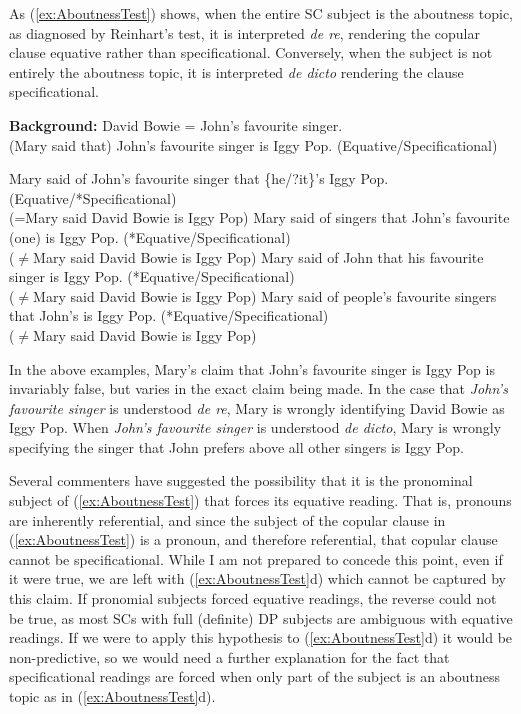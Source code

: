 \documentclass[
	letterpaper,
]{article}
\begin{document}
As (\ref{ex:AboutnessTest}) shows, when the entire SC subject is the aboutness topic, as diagnosed by Reinhart's test, it is interpreted \textit{de re}, rendering the copular clause equative rather than specificational.
Conversely, when the subject is not entirely the aboutness topic, it is interpreted \textit{de dicto} rendering the clause specificational.
\begin{exe}
	\ex\label{ex:AboutnessTest} \textbf{Background:} David Bowie = John's favourite singer.\\
	(Mary said that) John's favourite singer is Iggy Pop. (Equative/Specificational)
	\begin{xlist}
		\ex Mary said of John's favourite singer that \{he/?it\}'s Iggy Pop.(Equative/*Specificational)\\
		(=Mary said David Bowie is Iggy Pop)
		\ex Mary said of singers that John's favourite (one) is Iggy Pop. (*Equative/Specificational)\\
		($\neq$Mary said David Bowie is Iggy Pop)
		\ex Mary said of John that his favourite singer is Iggy Pop. (*Equative/Specificational)\\
		($\neq$Mary said David Bowie is Iggy Pop)
		\ex Mary said of people's favourite singers that John's is Iggy Pop. (*Equative/Specificational)\\
		($\neq$Mary said David Bowie is Iggy Pop)
	\end{xlist}
\end{exe}
In the above examples, Mary's claim that John's favourite singer is Iggy Pop is invariably false, but varies in the exact claim being made.
In the case that \textit{John's favourite singer} is understood \textit{de re}, Mary is wrongly identifying David Bowie as Iggy Pop.
When \textit{John's favourite singer} is understood \textit{de dicto}, Mary is wrongly specifying the singer that John prefers above all other singers is Iggy Pop.

Several commenters have suggested the possibility that it is the pronominal subject of (\ref{ex:AboutnessTest}) that forces its equative reading.
That is, pronouns are inherently referential, and since the subject of the copular clause in (\ref{ex:AboutnessTest}) is a pronoun, and therefore referential, that copular clause cannot be specificational. 
While I am not prepared to concede this point, even if it were true, we are left with (\ref{ex:AboutnessTest}d) which cannot be captured by this claim.
If pronomial subjects forced equative readings, the reverse could not be true, as most SCs with full (definite) DP subjects are ambiguous with equative readings.
If we were to apply this hypothesis to (\ref{ex:AboutnessTest}d) it would be non-predictive, so we would need a further explanation for the fact that specificational readings are forced when only part of the subject is an aboutness topic as in (\ref{ex:AboutnessTest}d).
\end{document}
